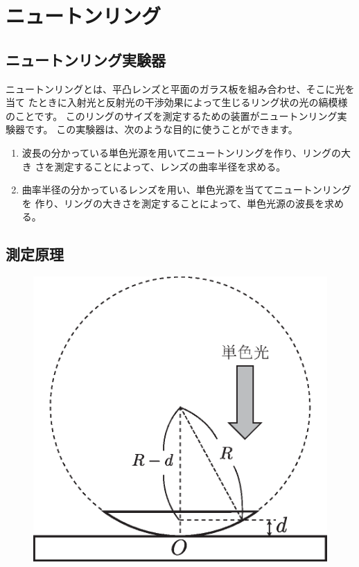 %
%


\section{ニュートンリング}

\subsection{ニュートンリング実験器}

ニュートンリングとは、平凸レンズと平面のガラス板を組み合わせ、そこに光を当て
たときに入射光と反射光の干渉効果によって生じるリング状の光の縞模様のことです。
このリングのサイズを測定するための装置がニュートンリング実験器です。
この実験器は、次のような目的に使うことができます。

\begin{enumerate}

\item 波長の分かっている単色光源を用いてニュートンリングを作り、リングの大き
さを測定することによって、レンズの曲率半径を求める。

\item 曲率半径の分かっているレンズを用い、単色光源を当ててニュートンリングを
作り、リングの大きさを測定することによって、単色光源の波長を求める。

\end{enumerate}

\subsection{測定原理}

\begin{figure}
\vspace*{-0.8cm}
\includegraphics[scale=0.6]{04_Newton/newton.eps}
\end{figure}


